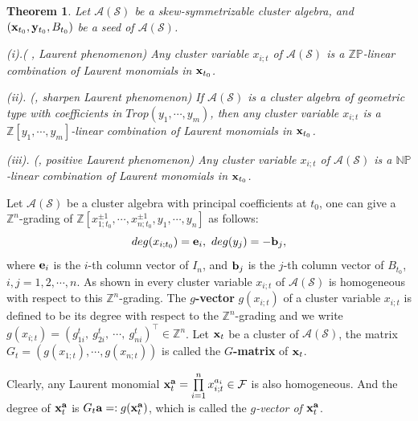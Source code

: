 \documentclass[14pt]{amsart}
\newtheorem{Theorem}{Theorem}[section]
\begin{document}
\begin{Theorem} \label{thmLP} Let $\mathcal A(\mathcal S)$ be a skew-symmetrizable cluster algebra, and $({\bf x}_{t_0},{\bf y}_{t_0},B_{t_0})$ be a  seed of $\mathcal A(\mathcal S)$.

(i).( \cite[Theorem 3.1]{FZ}, Laurent phenomenon)
 Any cluster variable $x_{i;t}$ of $\mathcal A(\mathcal S)$ is a $\mathbb {ZP}$-linear combination of  Laurent monomials in ${\bf x}_{t_0}$.


(ii). (\cite{FZ1}, sharpen Laurent phenomenon) If $\mathcal A(\mathcal S)$ is a cluster algebra of geometric type with coefficients in $Trop(y_1,\cdots,y_m)$, then any cluster variable $x_{i;t}$ is a
$\mathbb Z[y_1,\cdots,y_m]$-linear combination of  Laurent monomials in ${\bf x}_{t_0}$.

(iii). (\cite{GHKK}, positive  Laurent phenomenon)  Any cluster variable $x_{i;t}$ of $\mathcal A(\mathcal S)$ is a $\mathbb {NP}$-linear combination of Laurent monomials in ${\bf x}_{t_0}$.
\end{Theorem}




Let $\mathcal A(\mathcal S)$ be a cluster algebra with principal coefficients at $t_0$, one can give a $\mathbb Z^n$-grading of $\mathbb Z[x_{1;t_0}^{\pm1},\cdots,x_{n;t_0}^{\pm1},y_1,\cdots,y_n]$ as follows:
$$deg(x_{i;t_0})={\bf e}_i,~deg(y_j)=-{\bf b}_j,$$
where ${\bf e}_i$ is the $i$-th column vector of $I_n$, and ${\bf b}_j$ is the $j$-th column vector of $B_{t_0}$, $i,j=1,2,\cdots,n$. As shown in \cite{FZ3} every cluster variable $x_{i;t}$ of $\mathcal A(\mathcal S)$ is homogeneous with respect to this $\mathbb Z^n$-grading. The {\bf $g$-vector} $g(x_{i;t})$ of a cluster variable $x_{i;t}$ is defined to be its degree with respect to the $\mathbb Z^n$-grading and we write $g(x_{i;t})=(g_{1i}^t,~g_{2i}^t,~\cdots,~g_{ni}^t)^{\top}\in\mathbb Z^n$. Let ${\bf x}_t$ be a cluster of $\mathcal A(\mathcal S)$,  the matrix $G_t=(g(x_{1;t}),\cdots,g(x_{n;t}))$ is called the {\bf $G$-matrix} of ${\bf x}_t$.

Clearly, any Laurent monomial ${\bf x}_t^{\bf a}=\prod\limits_{i=1}^{n}x_{i;t}^{a_i}\in\mathcal F$ is also homogeneous. And the degree of  ${\bf x}_t^{\bf a}$ is $G_t{\bf a}=:g({\bf x}_t^{\bf a})$, which is called the {\em $g$-vector of ${\bf x}_t^{\bf a}$}.
\end{document}
